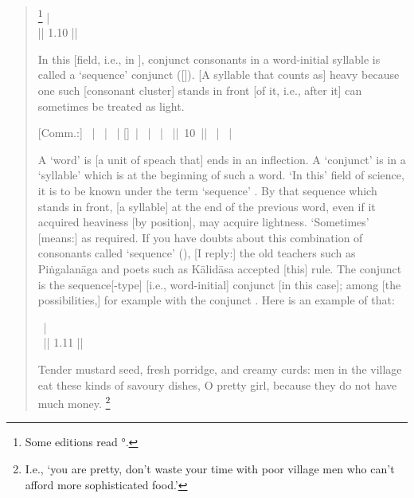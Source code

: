 \begin{quote}
%
                \footnote{Some editions read °.}
 | \\
 || 1.10 ||

In this [field, i.e., in ], conjunct consonants
 in a word-initial syllable  is
called a `sequence' conjunct ([]). 
[A syllable that counts as] heavy because one
such [consonant cluster] stands in front [of it, i.e., after it] can 
sometimes be treated as light.

{\footnotesize [Comm.:] 
~|
~|
~| 
[]~| 
~| 
~|~
||~10~||
~| 
~|}

{\footnotesize
A `word' is [a unit of speach that] ends in an inflection. 
A `conjunct' is in a `syllable' which is
at the beginning of such a word. 
`In this' field of science, it is to be known under the 
term `sequence' \ie{\krama}. By that sequence which stands in front, 
[a syllable] at the end of the previous word, even if it acquired
heaviness [by position], may acquire lightness. `Sometimes' [means:]
as required.
If you have doubts about this combination of consonants called `sequence' (\krama),
[I reply:] the old teachers such as Pi\-ṅgalanāga and poets such as Kālidāsa
accepted [this] rule. The conjunct\linebreak {}
is the sequence[-type] \ie{\krama} [i.e., word-initial]
conjunct\linebreak {} [in this case]; among [the possibilities,] for example with the conjunct .
Here is an example of that:}

~|\\
~|| 1.11 ||

Tender mustard seed, fresh porridge, and creamy curds: men in the village eat
these kinds of savoury dishes, O pretty girl, because they do not have
much money.%
	\footnote{I.e., `you are pretty, don't waste your time with poor village men who can't afford
                         more sophisticated food.'}
\end{quote}

